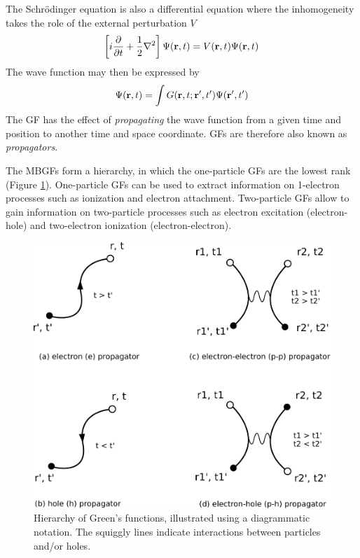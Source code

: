 The Schrödinger equation is also a differential equation where the inhomogeneity takes the role of the external perturbation $V$
\begin{equation}
\left[ i\frac{\partial}{\partial t} + \frac{1}{2} \nabla^2 \right] \Psi(\mathbf{r},t) = V(\mathbf{r},t) \Psi(\mathbf{r},t)
\end{equation}
\noindent The wave function may then be expressed by
\begin{equation}
\Psi(\mathbf{r},t) = \int G(\mathbf{r},t;\mathbf{r}',t') \Psi(\mathbf{r}',t')
\end{equation}
\noindent The GF has the effect of \emph{propagating} the wave function from a given time and position to another time and space coordinate. GFs are therefore also known as \emph{propagators}.

The MBGFs form a hierarchy, in which the one-particle GFs are the lowest rank (Figure \ref{fig:PROP}). One-particle GFs can be used to extract information on 1-electron processes such as ionization and electron attachment. Two-particle GFs allow to gain information on two-particle processes such as electron excitation (electron-hole) and two-electron ionization (electron-electron). 

\begin{figure}[h]
\centering
\includegraphics[scale=0.6]{Pics/PROP}
\caption[Hierarchy of Green's functions]{Hierarchy of Green's functions, illustrated using a diagrammatic notation. The squiggly lines indicate interactions between particles and/or holes. }
\label{fig:PROP}
\end{figure}

